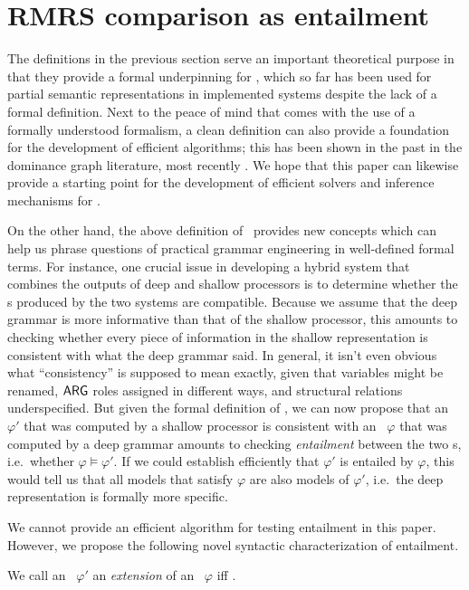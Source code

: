 \section{RMRS comparison as entailment}
\label{sec:entailment}

The definitions in the previous section serve an important theoretical
purpose in that they provide a formal underpinning for \rmrs, which so
far has been used for partial semantic representations in implemented
systems despite the lack of a formal definition.  Next to the peace of
mind that comes with the use of a formally understood formalism, a
clean definition can also provide a foundation for the development of
efficient algorithms; this has been shown in the past in the dominance
graph literature, most recently .  We hope that
this paper can likewise provide a starting point for the development
of efficient solvers and inference mechanisms for \rmrs.

On the other hand, the above definition of \rmrs\ provides new
concepts which can help us phrase questions of practical grammar
engineering in well-defined formal terms.  For instance, one crucial
issue in developing a hybrid system that combines the outputs of deep
and shallow processors is to determine whether the \rmrs s produced by
the two systems are compatible.  Because we assume that the deep
grammar is more informative than that of the shallow processor, this
amounts to checking whether every piece of information in the shallow
representation is consistent with what the deep grammar said.  In
general, it isn't even obvious what ``consistency'' is supposed to
mean exactly, given that variables might be renamed, $\mathsf{ARG}$ roles
assigned in different ways, and structural relations underspecified.
But given the formal definition of \rmrs, we can now propose that an
\rmrs\ $\varphi'$ that was computed by a shallow processor is
consistent with an \rmrs\ $\varphi$ that was computed by a deep
grammar amounts to checking \emph{entailment} between the two \rmrs s,
i.e.\ whether $\varphi \models \varphi'$.  If we could establish
efficiently that $\varphi'$ is entailed by $\varphi$, this would tell
us that all models that satisfy $\varphi$ are also models of
$\varphi'$, i.e.\ the deep representation is formally more specific.

We cannot provide an efficient algorithm for testing entailment in
this paper.  However, we propose the following novel syntactic
characterization of entailment.

\begin{definition}
  We call an \rmrs\ $\varphi'$ an \emph{extension} of an \rmrs\
  $\varphi$ iff \todo{fill this in -- don't have the def with me right
    now}.
\end{definition}

